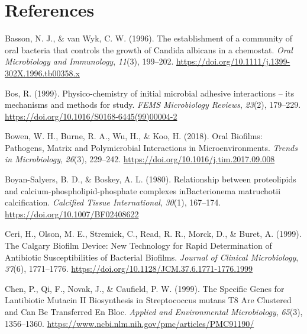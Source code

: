 \documentclass[
  letterpaper,
]{book}
\newlength{\cslhangindent}
\newlength{\cslentryspacingunit} %
\newenvironment{CSLReferences}[2] %
 {%
  \setlength{\parindent}{0pt}
  \ifodd #1
  \let\oldpar\par
  \def\par{\hangindent=\cslhangindent\oldpar}
  \fi
  \setlength{\parskip}{#2\cslentryspacingunit}
 }%
 {}
\begin{document}
\hypertarget{references-1}{%
\section*{References}\label{references-1}}


\hypertarget{refs-2}{}
\begin{CSLReferences}{1}{0}
\leavevmode{}%
Basson, N. J., \& van Wyk, C. W. (1996). The establishment of a
community of oral bacteria that controls the growth of {Candida}
albicans in a chemostat. \emph{Oral Microbiology and Immunology},
\emph{11}(3), 199--202.
\url{https://doi.org/10.1111/j.1399-302X.1996.tb00358.x}

\leavevmode{}%
Bos, R. (1999). Physico-chemistry of initial microbial adhesive
interactions -- its mechanisms and methods for study. \emph{FEMS
Microbiology Reviews}, \emph{23}(2), 179--229.
\url{https://doi.org/10.1016/S0168-6445(99)00004-2}

\leavevmode{}%
Bowen, W. H., Burne, R. A., Wu, H., \& Koo, H. (2018). Oral {Biofilms}:
{Pathogens}, {Matrix} and {Polymicrobial Interactions} in
{Microenvironments}. \emph{Trends in Microbiology}, \emph{26}(3),
229--242. \url{https://doi.org/10.1016/j.tim.2017.09.008}

\leavevmode{}%
Boyan-Salyers, B. D., \& Boskey, A. L. (1980). Relationship between
proteolipids and calcium-phospholipid-phosphate complexes
{inBacterionema} matruchotii calcification. \emph{Calcified Tissue
International}, \emph{30}(1), 167--174.
\url{https://doi.org/10.1007/BF02408622}

\leavevmode{}%
Ceri, H., Olson, M. E., Stremick, C., Read, R. R., Morck, D., \& Buret,
A. (1999). The {Calgary Biofilm Device}: {New Technology} for {Rapid
Determination} of {Antibiotic Susceptibilities} of {Bacterial Biofilms}.
\emph{Journal of Clinical Microbiology}, \emph{37}(6), 1771--1776.
\url{https://doi.org/10.1128/JCM.37.6.1771-1776.1999}

\leavevmode{}%
Chen, P., Qi, F., Novak, J., \& Caufield, P. W. (1999). The {Specific
Genes} for {Lantibiotic Mutacin II Biosynthesis} in {Streptococcus}
mutans {T8 Are Clustered} and {Can Be} {Transferred En Bloc}.
\emph{Applied and Environmental Microbiology}, \emph{65}(3), 1356--1360.
\url{https://www.ncbi.nlm.nih.gov/pmc/articles/PMC91190/}


\end{CSLReferences}
\end{document}
